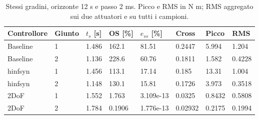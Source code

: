 \begin{table}[htbp]\centering\small
\begin{tabular}{llllllll}\toprule
Controllore & Giunto & $t_s$ [s] & OS [\%] & $e_{ss}$ [\%] & Cross & Picco & RMS\\\midrule
Baseline & 1 & 1.486 & 162.1 & 81.51 & 0.2447 & 5.994 & 1.204\\
Baseline & 2 & 1.136 & 228.6 & 60.76 & 0.1811 & 1.582 & 0.4228\\
hinfsyn & 1 & 1.456 & 113.1 & 17.14 & 0.185 & 13.31 & 1.004\\
hinfsyn & 2 & 1.148 & 130.1 & 15.81 & 0.1726 & 3.973 & 0.3518\\
2DoF & 1 & 1.552 & 1.763 & 3.109e-13 & 0.0325 & 0.8432 & 0.5808\\
2DoF & 2 & 1.784 & 0.1906 & 1.776e-13 & 0.02932 & 0.2175 & 0.1994\\
\bottomrule\end{tabular}
\caption{Stessi gradini, orizzonte 12 s e passo 2 ms. Picco e RMS in N m; RMS aggregato sui due attuatori e su tutti i campioni.}\end{table}
